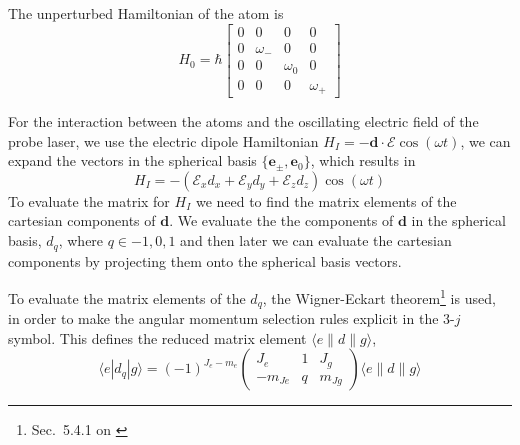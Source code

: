 \documentclass[11pt,letter]{article}
\newcommand{\bv}[1]{\ensuremath{\bm{#1}}}
\newcommand{\efield}{\ensuremath{\bv{\mathcal{E}}}}
\begin{document}
The unperturbed Hamiltonian of the atom is 
\begin{equation}
H_{0} = \hbar \left[\begin{smallmatrix}0 & 0 & 0 & 0\\0 & \omega_{{-}} & 0 & 0\\0 & 0 & \omega_{{0}} & 0\\0 & 0 & 0 & \omega_{{+}}\end{smallmatrix}\right]
\end{equation} 

For the interaction between the atoms and the oscillating electric field of the
probe laser, we use the electric dipole Hamiltonian $H_{I} = - \bv{d} \cdot
\efield\cos(\omega t)$, we can expand the vectors in the spherical basis $\lbrace
\bv{e}_{\pm}, \bv{e}_{0} \rbrace$, which results in 
\begin{equation}
  H_{I} = - \left( \mathcal{E}_{x} d_{x}  
          + \mathcal{E}_{y} d_{y} + \mathcal{E}_{z} d_{z} \right) 
            \cos(\omega t )  
\end{equation} 
To evaluate the matrix for $H_{I}$ we need to find the matrix elements of
the cartesian components of $\bv{d}$.  We evaluate the the components of $\bv{d}$
in the spherical basis, $d_{q}$, where $q\in{-1,0,1}$ and then later we can
evaluate the cartesian components by projecting them onto the spherical basis
vectors.  

To evaluate the matrix elements of the $d_{q}$, the Wigner-Eckart
theorem\footnote{Sec.~5.4.1 on \cite{edmonds1996angular}} is used, in order to
make the angular momentum selection rules explicit in the 3-$j$ symbol.  This
defines the reduced matrix element $\langle e \lVert d \rVert g \rangle$,
\begin{equation}
  \langle e | d_{q} | g \rangle = 
      (-1)^{J_{e}-m_{e}} 
      \begin{pmatrix} J_{e} & 1 & J_{g} \\ -m_{Je} & q & m_{Jg} \end{pmatrix}
      \langle e \lVert d \rVert g \rangle
\end{equation}
\end{document}
